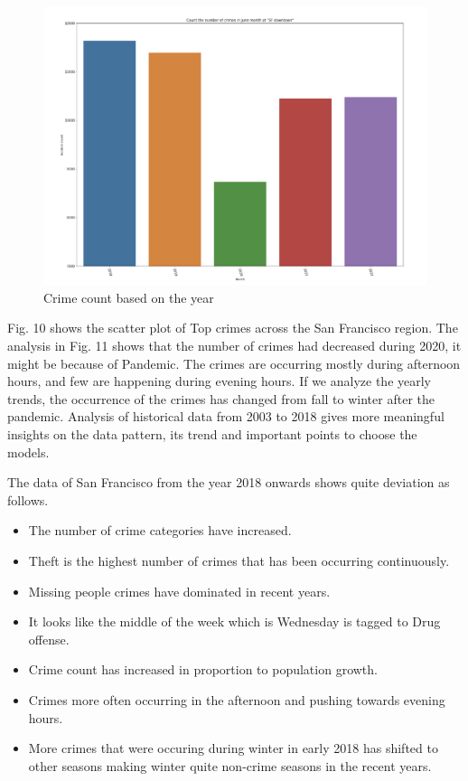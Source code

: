 \documentclass[10 pt,conference,final,]{IEEEtran}
\providecommand{\tightlist}{%
  \setlength{\itemsep}{0pt}\setlength{\parskip}{0pt}}
\begin{document}
\begin{figure}

{\centering \includegraphics[width=0.8\linewidth]{img/fig11} 

}

\caption{Crime count based on the year}\label{fig:unnamed-chunk-11}
\end{figure}

Fig. 10 shows the scatter plot of Top crimes across the San Francisco
region. The analysis in Fig. 11 shows that the number of crimes had
decreased during 2020, it might be because of Pandemic. The crimes are
occurring mostly during afternoon hours, and few are happening during
evening hours. If we analyze the yearly trends, the occurrence of the
crimes has changed from fall to winter after the pandemic. Analysis of
historical data from 2003 to 2018 gives more meaningful insights on the
data pattern, its trend and important points to choose the models.

The data of San Francisco from the year 2018 onwards shows quite
deviation as follows.

\begin{itemize}
\tightlist
\item
  The number of crime categories have increased.
\item
  Theft is the highest number of crimes that has been occurring
  continuously.
\item
  Missing people crimes have dominated in recent years.
\item
  It looks like the middle of the week which is Wednesday is tagged to
  Drug offense.
\item
  Crime count has increased in proportion to population growth.
\item
  Crimes more often occurring in the afternoon and pushing towards
  evening hours.
\item
  More crimes that were occuring during winter in early 2018 has shifted
  to other seasons making winter quite non-crime seasons in the recent
  years.
\end{itemize}
\end{document}
